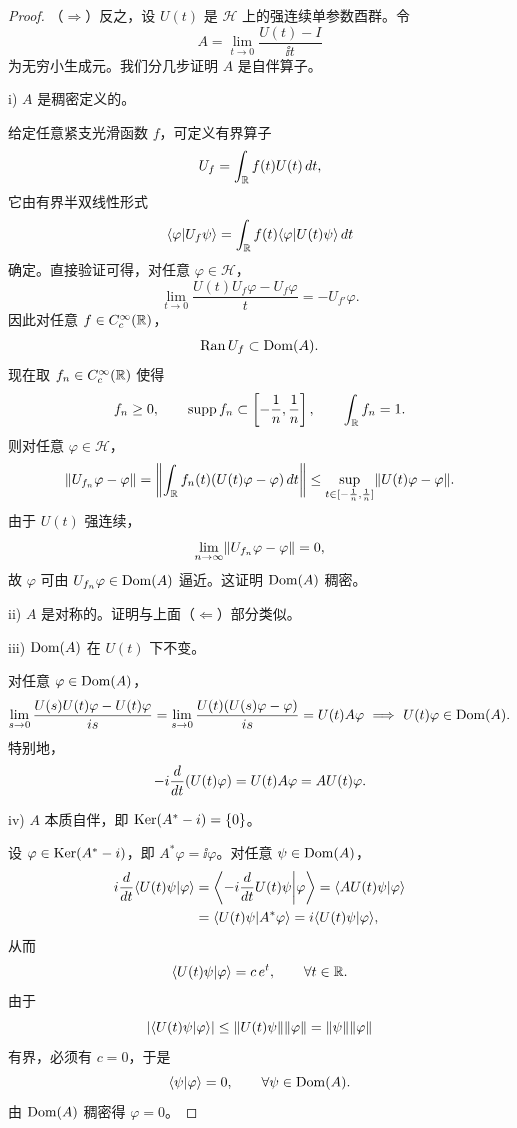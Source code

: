 \begin{proof}
  （$\Rightarrow$）反之，设 $U(t)$ 是 $\mathcal{H}$ 上的强连续单参数酉群。令
  \[
  A=\lim_{t\to 0}\frac{U(t)-I}{\ii t}
  \]
  为无穷小生成元。我们分几步证明 $A$ 是自伴算子。

  i) $A$ 是稠密定义的。

  给定任意紧支光滑函数 $f$，可定义有界算子
  \[
  U_f=\int_{\mathbb{R}} f(t)U(t)\,d t,
  \]
  它由有界半双线性形式
  \[
  \langle\varphi|U_f\psi\rangle=\int_{\mathbb{R}} f(t)\langle\varphi|U(t)\psi\rangle\,d t
  \]
  确定。直接验证可得，对任意 $\varphi\in\mathcal{H}$，
  \[
  \lim_{t\to 0}\frac{U(t)U_f\varphi-U_f\varphi}{t}=-U_{f'}\varphi.
  \]
  因此对任意 $f\in C_c^\infty(\mathbb{R})$，
  \[
  \operatorname{Ran} U_f\subset\operatorname{Dom}(A).
  \]
  现在取 $f_n\in C_c^\infty(\mathbb{R})$ 使得
  \[
  f_n\ge0,\qquad \operatorname{supp} f_n\subset\left[-\frac1n,\frac1n\right],\qquad \int_{\mathbb{R}} f_n=1.
  \]
  则对任意 $\varphi\in\mathcal{H}$，
  \[
  \lVert U_{f_n}\varphi-\varphi\rVert
  =\left\|\int_{\mathbb{R}} f_n(t)(U(t)\varphi-\varphi)\,d t\right\|
  \le\sup_{t\in[-\frac1n,\frac1n]}\lVert U(t)\varphi-\varphi\rVert.
  \]
  由于 $U(t)$ 强连续，
  \[
  \lim_{n\to\infty}\lVert U_{f_n}\varphi-\varphi\rVert=0,
  \]
  故 $\varphi$ 可由 $U_{f_n}\varphi\in\operatorname{Dom}(A)$ 逼近。这证明 $\operatorname{Dom}(A)$ 稠密。

  ii) $A$ 是对称的。证明与上面（$\Leftarrow$）部分类似。

  iii) $\operatorname{Dom}(A)$ 在 $U(t)$ 下不变。

  对任意 $\varphi\in\operatorname{Dom}(A)$，
  \[
  \lim_{s\to 0}\frac{U(s)U(t)\varphi-U(t)\varphi}{i s}
  =\lim_{s\to 0}\frac{U(t)(U(s)\varphi-\varphi)}{i s}
  =U(t)A\varphi
  \ \Longrightarrow\ U(t)\varphi\in\operatorname{Dom}(A).
  \]
  特别地，
  \[
  -i\frac{d}{d t}(U(t)\varphi)=U(t)A\varphi=AU(t)\varphi.
  \]

  iv) $A$ 本质自伴，即 $\operatorname{Ker}(A^*-i)=\{0\}$。

  设 $\varphi\in\operatorname{Ker}(A^*-i)$，即 $A^*\varphi=\ii\varphi$。对任意 $\psi\in\operatorname{Dom}(A)$，
  \begin{align*}
  i\frac{d}{d t}\langle U(t)\psi|\varphi\rangle
  &=\left\langle-i\frac{d}{d t}U(t)\psi\middle|\varphi\right\rangle
  =\langle AU(t)\psi|\varphi\rangle\\
  &=\langle U(t)\psi|A^*\varphi\rangle
  =i\langle U(t)\psi|\varphi\rangle,
  \end{align*}
  从而
  \[
  \langle U(t)\psi|\varphi\rangle=c\,e^{t},\qquad\forall t\in\mathbb{R}.
  \]
  由于
  \[
  \lvert \langle U(t)\psi|\varphi\rangle\rvert\le\lVert U(t)\psi\rVert\lVert \varphi\rVert=\lVert \psi\rVert\lVert \varphi\rVert
  \]
  有界，必须有 $c=0$，于是
  \[
  \langle\psi|\varphi\rangle=0,\qquad\forall\psi\in\operatorname{Dom}(A).
  \]
  由 $\operatorname{Dom}(A)$ 稠密得 $\varphi=0$。


\end{proof}
